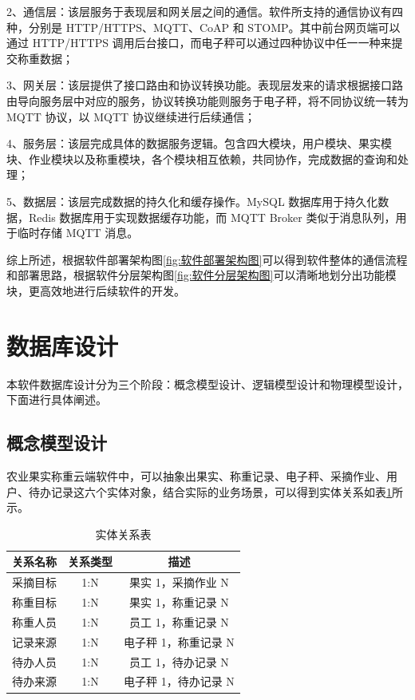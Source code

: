 2、通信层：该层服务于表现层和网关层之间的通信。软件所支持的通信协议有四种，分别是 HTTP/HTTPS、MQTT、CoAP 和 STOMP。其中前台网页端可以通过 HTTP/HTTPS 调用后台接口，而电子秤可以通过四种协议中任一一种来提交称重数据；

3、网关层：该层提供了接口路由和协议转换功能。表现层发来的请求根据接口路由导向服务层中对应的服务，协议转换功能则服务于电子秤，将不同协议统一转为 MQTT 协议，以 MQTT 协议继续进行后续通信；

4、服务层：该层完成具体的数据服务逻辑。包含四大模块，用户模块、果实模块、作业模块以及称重模块，各个模块相互依赖，共同协作，完成数据的查询和处理；

5、数据层：该层完成数据的持久化和缓存操作。MySQL 数据库用于持久化数据，Redis 数据库用于实现数据缓存功能，而 MQTT Broker 类似于消息队列，用于临时存储 MQTT 消息。

综上所述，根据软件部署架构图\ref{fig:软件部署架构图}可以得到软件整体的通信流程和部署思路，根据软件分层架构图\ref{fig:软件分层架构图}可以清晰地划分出功能模块，更高效地进行后续软件的开发。

\section{数据库设计}\label{sec:database}

本软件数据库设计分为三个阶段：概念模型设计、逻辑模型设计和物理模型设计，下面进行具体阐述。

\subsection{概念模型设计}

农业果实称重云端软件中，可以抽象出果实、称重记录、电子秤、采摘作业、用户、待办记录这六个实体对象，结合实际的业务场景，可以得到实体关系如表\ref{tab:ertab}所示。

\begin{table}[H]
\centering
\caption{实体关系表}
\label{tab:ertab}
\begin{tabular}{|c|c|c|}
\hline
关系名称 & 关系类型 & 描述 \\ \hline

采摘目标 & 1:N & 果实 1，采摘作业 N \\ \hline

称重目标 & 1:N & 果实 1，称重记录 N \\ \hline

称重人员 & 1:N & 员工 1，称重记录 N  \\ \hline

记录来源 & 1:N & 电子秤 1，称重记录 N \\ \hline

待办人员 & 1:N & 员工 1，待办记录 N \\ \hline

待办来源 & 1:N & 电子秤 1，待办记录 N \\ \hline

\end{tabular}%
\end{table}

